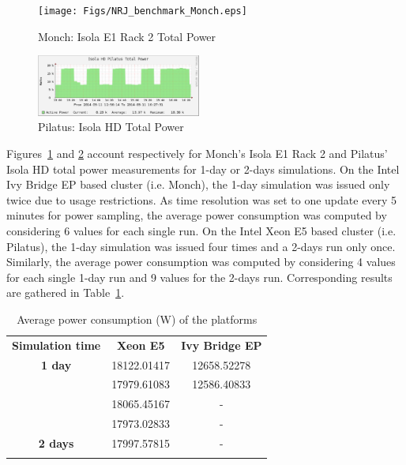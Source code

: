 \begin{figure}[htbf]
  \begin{center}
    \texttt{[image: Figs/NRJ\_benchmark\_Monch.eps]}
    \caption{Monch: Isola E1 Rack 2 Total Power}
    \label{fig:1}
  \end{center}
\end{figure}

\begin{figure}[htbf]
  \begin{center}
    \includegraphics[width=0.48\textwidth]{Figs/NRJ_benchmark_Pilatus.eps}
    \caption{Pilatus: Isola HD Total Power}
    \label{fig:2}
  \end{center}
\end{figure}

Figures~\ref{fig:1} and  \ref{fig:2} account respectively  for Monch's
Isola E1  Rack 2  and Pilatus' Isola  HD total power  measurements for
1-day or 2-days simulations. On  the Intel Ivy Bridge EP based cluster
(i.e. Monch), the 1-day simulation  was issued only twice due to usage
restrictions. As time resolution was set to one update every 5 minutes
for  power sampling,  the average  power consumption  was  computed by
considering 6 values for each single  run.  On the Intel Xeon E5 based
cluster (i.e.   Pilatus), the 1-day  simulation was issued  four times
and a 2-days  run only once. Similarly, the  average power consumption
was computed by  considering 4 values for each single  1-day run and 9
values  for the  2-days  run. Corresponding  results  are gathered  in
Table~\ref{tab:3}.

\begin{table}[htbf]
  \begin{center}
    \caption{Average power consumption (W) of the platforms}
    \label{tab:3}
    \begin{tabular}{ccc}
      \hline\noalign{\smallskip}
      \textbf{Simulation time} & \textbf{Xeon E5} & \textbf{Ivy Bridge EP} \\
      \noalign{\smallskip}\hline\noalign{\smallskip}
      \textbf{1 day} & 18122.01417 & 12658.52278 \\ 
      & 17979.61083 & 12586.40833 \\
      & 18065.45167 & - \\
      & 17973.02833 & - \\
      \noalign{\smallskip}\hline\noalign{\smallskip}
      \textbf{2 days} & 17997.57815 & - \\
      \noalign{\smallskip}\hline
    \end{tabular}
  \end{center}
\end{table}

